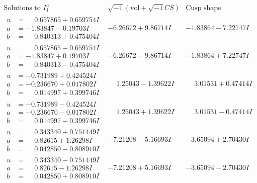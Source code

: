 \documentclass[1p]{elsarticle_modified}
\theoremstyle{definition}
\newcommand{\I}{\sqrt{-1}}
\begin{document}
$$\begin{array}{c|c|c}  
\text{Solutions to }I^u_{1}& \I (\text{vol} + \sqrt{-1}CS) & \text{Cusp shape}\\
 \hline 
\begin{aligned}
u &= \phantom{-}0.657865 + 0.659754 I \\
a &= -1.83847 - 0.19703 I \\
b &= \phantom{-}0.840313 + 0.475404 I\end{aligned}
 & -6.26672 + 9.86714 I & -1.83864 - 7.22747 I \\ \hline\begin{aligned}
u &= \phantom{-}0.657865 - 0.659754 I \\
a &= -1.83847 + 0.19703 I \\
b &= \phantom{-}0.840313 - 0.475404 I\end{aligned}
 & -6.26672 - 9.86714 I & -1.83864 + 7.22747 I \\ \hline\begin{aligned}
u &= -0.731989 + 0.424524 I \\
a &= -0.236670 + 0.017802 I \\
b &= \phantom{-}0.014997 + 0.399746 I\end{aligned}
 & \phantom{-}1.25043 - 1.39622 I & \phantom{-}3.01531 + 0.47414 I \\ \hline\begin{aligned}
u &= -0.731989 - 0.424524 I \\
a &= -0.236670 - 0.017802 I \\
b &= \phantom{-}0.014997 - 0.399746 I\end{aligned}
 & \phantom{-}1.25043 + 1.39622 I & \phantom{-}3.01531 - 0.47414 I \\ \hline\begin{aligned}
u &= \phantom{-}0.343340 + 0.751449 I \\
a &= \phantom{-}0.82615 + 1.26298 I \\
b &= \phantom{-}0.042850 - 0.808910 I\end{aligned}
 & -7.21208 - 5.16693 I & -3.65094 + 2.70430 I \\ \hline\begin{aligned}
u &= \phantom{-}0.343340 - 0.751449 I \\
a &= \phantom{-}0.82615 - 1.26298 I \\
b &= \phantom{-}0.042850 + 0.808910 I\end{aligned}
 & -7.21208 + 5.16693 I & -3.65094 - 2.70430 I \\ \hline\begin{aligned}

\end{aligned}
\end{array}$$
\end{document}

